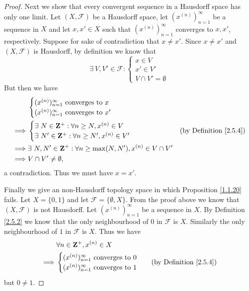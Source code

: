 \begin{proof}
    Next we show that every convergent sequence in a Hausdorff space has only one limit.
    Let \((X, \mathcal{F})\) be a Hausdorff space, let \((x^{(n)})_{n = 1}^\infty\) be a sequence in \(X\) and let \(x, x' \in X\) such that \((x^{(n)})_{n = 1}^\infty\) converges to \(x, x'\), respectively.
    Suppose for sake of contradiction that \(x \neq x'\).
    Since \(x \neq x'\) and \((X, \mathcal{F})\) is Hausdorff, by definition we know that
    \[
        \exists\ V, V' \in \mathcal{F} : \begin{cases}
            x \in V   \\
            x' \in V' \\
            V \cap V' = \emptyset
        \end{cases}
    \]
    But then we have
    \begin{align*}
                 & \begin{cases}
                       (x^{(n)})_{n = 1}^\infty \text{ converges to } x \\
                       (x^{(n)})_{n = 1}^\infty \text{ converges to } x'
                   \end{cases}                            \\
        \implies & \begin{cases}
                       \exists\ N \in \mathbf{Z}^+ : \forall n \geq N, x^{(n)} \in V \\
                       \exists\ N' \in \mathbf{Z}^+ : \forall n \geq N', x^{(n)} \in V'
                   \end{cases}                    & \text{(by Definition \ref{2.5.4})}         \\
        \implies & \exists\ N, N' \in \mathbf{Z}^+ : \forall n \geq \max(N, N'), x^{(n)} \in V \cap V' \\
        \implies & V \cap V' \neq \emptyset,
    \end{align*}
    a contradiction.
    Thus we must have \(x = x'\).

    Finally we give an non-Hausdorff topology space in which Proposition \ref{1.1.20} fails.
    Let \(X = \{0, 1\}\) and let \(\mathcal{F} = \{\emptyset, X\}\).
    From the proof above we know that \((X, \mathcal{F})\) is not Hausdorff.
    Let \((x^{(n)})_{n = 1}^\infty\) be a sequence in \(X\).
    By Definition \ref{2.5.2} we know that the only neighbourhood of \(0\) in \(\mathcal{F}\) is \(X\).
    Similarly the only neighbourhood of \(1\) in \(\mathcal{F}\) is \(X\).
    Thus we have
    \begin{align*}
                 & \forall n \in \mathbf{Z}^+, x^{(n)} \in X                \\
        \implies & \begin{cases}
                       (x^{(n)})_{n = 1}^\infty \text{ converges to } 0 \\
                       (x^{(n)})_{n = 1}^\infty \text{ converges to } 1
                   \end{cases} & \text{(by Definition \ref{2.5.4})}
    \end{align*}
    but \(0 \neq 1\).
\end{proof}

